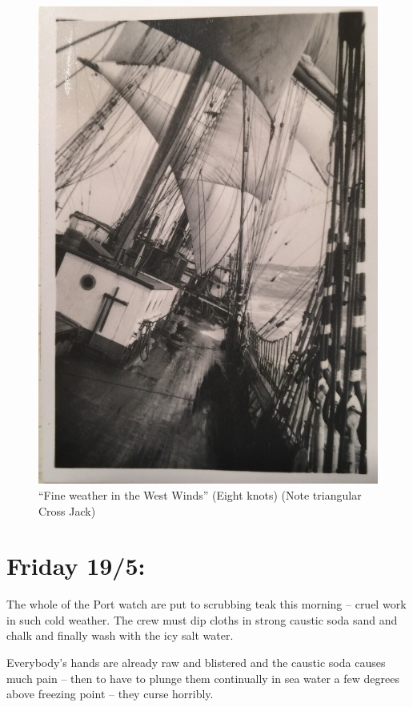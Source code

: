 \documentclass[
  11pt,
  msmallroyalvopaper
]{memoir}
\begin{document}
\begin{figure}
\centering
\includegraphics{./images/image013.jpg}
\caption{``Fine weather in the West Winds'' (Eight knots) (Note
triangular Cross Jack)}
\end{figure}

\hypertarget{friday-195}{%
\section{Friday 19/5:}\label{friday-195}}

The whole of the Port watch are put to scrubbing teak this morning --
cruel work in such cold weather. The crew must dip cloths in strong
caustic soda sand and chalk and finally wash with the icy salt water.

Everybody's hands are already raw and blistered and the caustic soda
causes much pain -- then to have to plunge them continually in sea water
a few degrees above freezing point -- they curse horribly.
\end{document}
